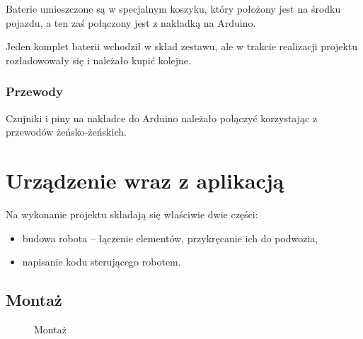 \documentclass[11pt]{article}
\begin{document}
Baterie umieszczone są w specjalnym koszyku, który położony jest na środku pojazdu, a ten zaś połączony jest z nakładką na Arduino.

Jeden komplet baterii wchodził w skład zestawu, ale w trakcie realizacji projektu rozładowowały się i należało kupić kolejne.

\subsubsection*{Przewody}

Czujniki i piny na nakładce do Arduino należało połączyć korzystając z przewodów żeńsko-żeńskich.

\newpage




\section{Urządzenie wraz z aplikacją}

Na wykonanie projektu składają się właściwie dwie części:
\begin{itemize}
\item budowa robota -- łączenie elementów, przykręcanie ich do podwozia,
\item napisanie kodu sterującego robotem.
\end{itemize}

\subsection{Montaż}

\newcommand{\www}{0.32}

\begin{figure}[p!]
	\centering
	
	\hfill%
	\hfill%
	
	\hfill%
	\hfill%
	
	\hfill%
	\hfill%
	
	\hfill%
	\hfill%

	\caption{Montaż \label{fig:montaz}}
\end{figure}
\end{document}
